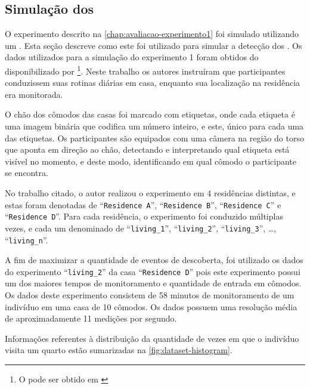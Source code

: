 \subsection{Simulação dos \beacons}\label{chap:avaliacao-simulacao-beacons}

O experimento descrito na \autoref{chap:avaliacao-experimento1} foi simulado utilizando um \dataset. Esta seção descreve como este \dataset foi utilizado para simular a detecção dos \beacons. Os dados utilizados para a simulação do experimento 1 foram obtidos do \dataset disponibilizado por \footnote{O \dataset pode ser obtido em \cite{byrne:kozlowski:dataset:2019}}. Neste trabalho os autores instruíram que participantes conduzissem suas rotinas diárias em casa, enquanto sua localização na residência era monitorada.

O chão dos cômodos das casas foi marcado com etiquetas, onde cada etiqueta é uma imagem binária que codifica um número inteiro, e este, único para cada uma das etiquetas. Os participantes são equipados com uma câmera na região do torso que aponta em direção ao chão, detectando e interpretando qual etiqueta está visível no momento, e deste modo, identificando em qual cômodo o participante se encontra.

No trabalho citado, o autor realizou o experimento em 4 residências distintas, e estas foram denotadas de ``\texttt{Residence A}'', ``\texttt{Residence B}'', ``\texttt{Residence C}'' e ``\texttt{Residence D}''. Para cada residência, o experimento foi conduzido múltiplas vezes, e cada um denominado de ``\texttt{living\_1}'', ``\texttt{living\_2}'', ``\texttt{living\_3}'', \dots{}, ``\texttt{living\_n}''.


A fim de maximizar a quantidade de eventos de descoberta, foi utilizado os dados do experimento ``\texttt{living\_2}'' da casa ``\texttt{Residence D}'' pois este experimento possui um dos maiores tempos de monitoramento e quantidade de entrada em cômodos. Os dados deste experimento consistem de 58 minutos de monitoramento de um indivíduo em uma casa de 10 cômodos. Os dados possuem uma resolução média de aproximadamente 11 medições por segundo.

Informações referentes à distribuição da quantidade de vezes em que o indivíduo visita um quarto estão sumarizadas na \autoref{fig:dataset-histogram}.


